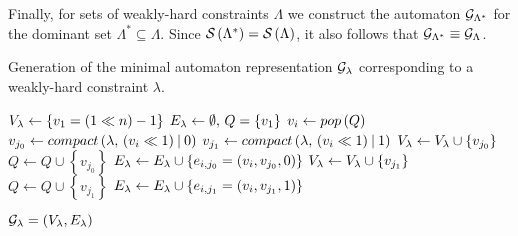 Finally, for sets of weakly-hard constraints $\Lambda$ we construct the automaton $\mathcal{G}_{\Lambda^*}$ for the dominant set $\Lambda^* \subseteq \Lambda$. 
Since $\mathcal{S}_{}\left( \Lambda^* \right) = \mathcal{S}_{}\left( \Lambda \right)$, it also follows that $\mathcal{G}_{\Lambda^*} \equiv \mathcal{G}_{\Lambda}$.

\begin{algorithm}[t]\normalsize%
    \caption{Generation of the minimal automaton representation $\mathcal{G}_{\lambda}$ corresponding to a weakly-hard constraint $\lambda$.}
    \label{alg:tool:automata} 
    
    \begin{algorithmic}[1]
        \algnewcommand{}
    
            \State $V_{\lambda} \leftarrow \left\{ v_1 = \left( 1 \ll n \right) - 1 \right\}$
            \State $E_{\lambda} \leftarrow \emptyset,\, Q = \left\{ v_1 \right\}$
                \State $v_i \leftarrow pop\left( Q \right)$
                \State $v_{j_0} \leftarrow compact\left( \lambda,\, \left( v_i \ll 1 \right) \mathbin{|} 0 \right)$
                \State $v_{j_1} \leftarrow compact\left( \lambda,\, \left( v_i \ll 1 \right) \mathbin{|} 1 \right)$
                        \State $V_{\lambda} \leftarrow V_{\lambda} \cup \left\{ v_{j_0} \right\}$
                        \State $Q \leftarrow Q \cup \left\{ v_{j_0} \right\}$
                    \EndIf
                    \State $E_{\lambda} \leftarrow E_{\lambda} \cup \left\{ e_{i, j_0} = (v_i, v_{j_0}, 0) \right\}$
                \EndIf
                    \State $V_{\lambda} \leftarrow V_{\lambda} \cup \left\{ v_{j_1} \right\}$
                    \State $Q \leftarrow Q \cup \left\{ v_{j_1} \right\}$
                \EndIf
                \State $E_{\lambda} \leftarrow E_{\lambda} \cup \left\{ e_{i, j_1} = (v_i, v_{j_1}, 1) \right\}$
            \EndWhile
        
            \Return $\mathcal{G}_{\lambda} = \left( V_{\lambda}, E_{\lambda} \right)$
        \EndProcedure
    \end{algorithmic}
\end{algorithm}

